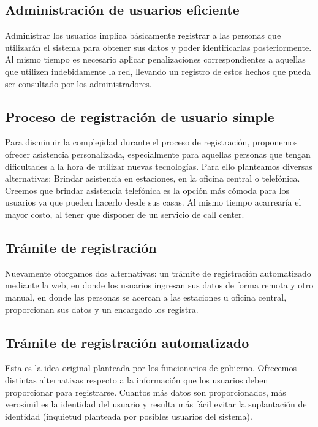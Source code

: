 \subsection{Administración de usuarios eficiente}

Administrar los usuarios implica básicamente registrar a las personas que utilizarán el sistema para obtener sus datos y 
poder identificarlas posteriormente. Al mismo tiempo es necesario aplicar penalizaciones correspondientes a aquellas que 
utilizen indebidamente la red, llevando un registro de estos hechos que pueda ser consultado por los administradores. 

\subsection{Proceso de registración de usuario simple}

Para disminuir la complejidad durante el proceso de registración, proponemos ofrecer asistencia personalizada, especialmente
para aquellas personas que tengan dificultades a la hora de utilizar nuevas tecnologías. Para ello planteamos diversas
alternativas: Brindar asistencia en estaciones, en la oficina central o telefónica.
Creemos que brindar asistencia telefónica es la opción más cómoda para los usuarios ya que pueden hacerlo desde sus casas.
Al mismo tiempo acarrearía el mayor costo, al tener que disponer de un servicio de call center.

\subsection{Trámite de registración}

Nuevamente otorgamos dos alternativas: un trámite de registración automatizado mediante la web, en donde los usuarios
ingresan sus datos de forma remota y otro manual, en donde las personas se acercan a las estaciones u oficina central,
proporcionan sus datos y un encargado los registra.

\subsection{Trámite de registración automatizado}

Esta es la idea original planteada por los funcionarios de gobierno. Ofrecemos distintas alternativas respecto a la información
que los usuarios deben proporcionar para registrarse. Cuantos más datos son proporcionados, más verosímil es la identidad del usuario y resulta más fácil evitar la suplantación de identidad (inquietud planteada por posibles usuarios del sistema).


